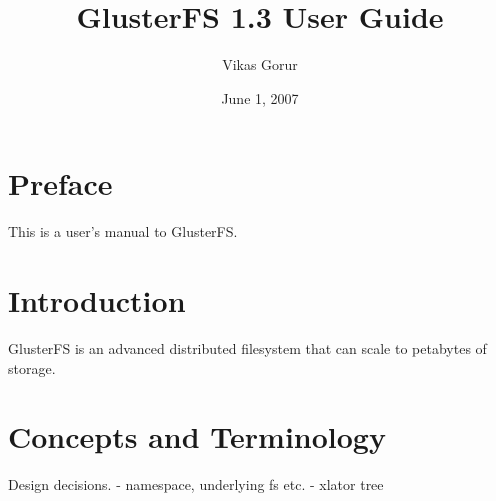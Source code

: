 \documentclass{book}[12pt]
\begin{document}

\author{Vikas Gorur}
\title{GlusterFS 1.3 User Guide}
\date{June 1, 2007}

\maketitle
\frontmatter
\tableofcontents

\chapter{Preface}

This is a user's manual to GlusterFS.


\mainmatter
\chapter{Introduction}

GlusterFS is an advanced distributed filesystem that can scale to
petabytes of storage.

\chapter{Concepts and Terminology}

Design decisions.
 - namespace, underlying fs etc.
 - xlator tree
\end{document}
